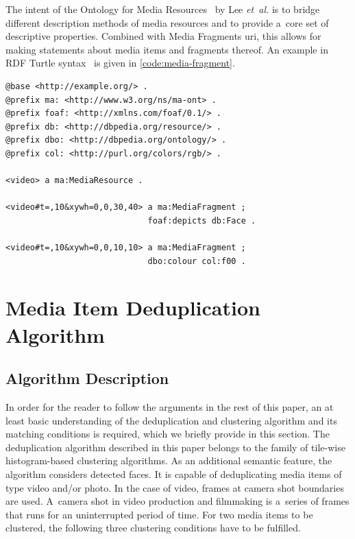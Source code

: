 \documentclass{article}
\begin{document}
The intent of the Ontology for Media Resources~\cite{lee2012mediaontology}
by Lee \emph{et~al.} is to bridge different description methods of media resources
and to provide a~core set of descriptive properties.
Combined with Media Fragments {\sc uri},
this allows for making statements about media items and fragments thereof.
An example in RDF Turtle syntax~\cite{prudhommeaux2013turtle}
is given in \autoref{code:media-fragment}.

\begin{lstlisting}[caption={Description of two 10~sec long media fragments:
  \textit{(i)}~a~tile of dimensions $ 30 \times 40 $ pixels
  starting at pixel coordinates $ (0, 0) $
  that contains a~face; and
  \textit{(ii)}~a~tile of dimensions $ 10 \times 10 $ pixels
  starting at pixel coordinates $ (0, 0) $ of red color},
  label=code:media-fragment, float=t!]
@base <http://example.org/> .
@prefix ma: <http://www.w3.org/ns/ma-ont> .
@prefix foaf: <http://xmlns.com/foaf/0.1/> .
@prefix db: <http://dbpedia.org/resource/> .
@prefix dbo: <http://dbpedia.org/ontology/> .
@prefix col: <http://purl.org/colors/rgb/> .

<video> a ma:MediaResource .

<video#t=,10&xywh=0,0,30,40> a ma:MediaFragment ;
                             foaf:depicts db:Face .
                             
<video#t=,10&xywh=0,0,10,10> a ma:MediaFragment ;
                             dbo:colour col:f00 .
\end{lstlisting}

\section{Media Item Deduplication Algorithm}
\label{sec:media-item-deduplication-algorithm}

\subsection{Algorithm Description}

In order for the reader to follow the arguments in the rest of this paper,
an at least basic understanding of the deduplication and clustering algorithm
and its matching conditions is required, which we briefly provide in this section.
The deduplication algorithm described in this paper
belongs to the family of tile-wise histogram-based clustering algorithms.
As an additional semantic feature, the algorithm considers detected faces.
It is capable of deduplicating media items of type video and/or photo.
In the case of video, frames at camera shot boundaries are used. %
A~camera shot in video production and filmmaking
is a~series of frames that runs for an uninterrupted period of time.
For two media items to be clustered,
the following three clustering conditions have to be fulfilled.
\end{document}
